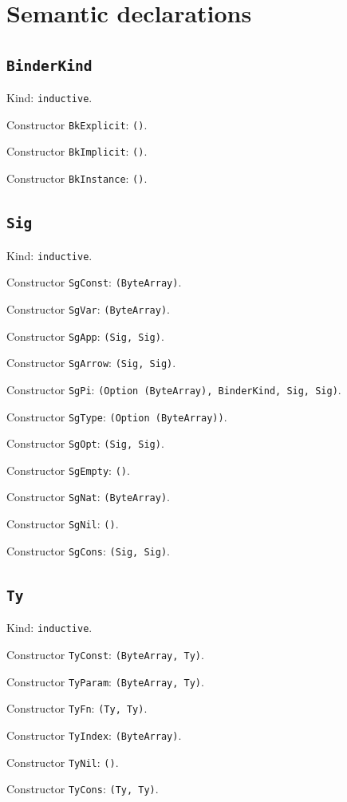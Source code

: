 \documentclass[11pt]{article}
\begin{document}
\section*{Semantic declarations}
\subsection*{\texttt{BinderKind}}
\noindent Kind: \texttt{inductive}.\par
\noindent Constructor \texttt{BkExplicit}: \texttt{()}.\par
\noindent Constructor \texttt{BkImplicit}: \texttt{()}.\par
\noindent Constructor \texttt{BkInstance}: \texttt{()}.\par
\subsection*{\texttt{Sig}}
\noindent Kind: \texttt{inductive}.\par
\noindent Constructor \texttt{SgConst}: \texttt{(ByteArray)}.\par
\noindent Constructor \texttt{SgVar}: \texttt{(ByteArray)}.\par
\noindent Constructor \texttt{SgApp}: \texttt{(Sig, Sig)}.\par
\noindent Constructor \texttt{SgArrow}: \texttt{(Sig, Sig)}.\par
\noindent Constructor \texttt{SgPi}: \texttt{(Option (ByteArray), BinderKind, Sig, Sig)}.\par
\noindent Constructor \texttt{SgType}: \texttt{(Option (ByteArray))}.\par
\noindent Constructor \texttt{SgOpt}: \texttt{(Sig, Sig)}.\par
\noindent Constructor \texttt{SgEmpty}: \texttt{()}.\par
\noindent Constructor \texttt{SgNat}: \texttt{(ByteArray)}.\par
\noindent Constructor \texttt{SgNil}: \texttt{()}.\par
\noindent Constructor \texttt{SgCons}: \texttt{(Sig, Sig)}.\par
\subsection*{\texttt{Ty}}
\noindent Kind: \texttt{inductive}.\par
\noindent Constructor \texttt{TyConst}: \texttt{(ByteArray, Ty)}.\par
\noindent Constructor \texttt{TyParam}: \texttt{(ByteArray, Ty)}.\par
\noindent Constructor \texttt{TyFn}: \texttt{(Ty, Ty)}.\par
\noindent Constructor \texttt{TyIndex}: \texttt{(ByteArray)}.\par
\noindent Constructor \texttt{TyNil}: \texttt{()}.\par
\noindent Constructor \texttt{TyCons}: \texttt{(Ty, Ty)}.\par
\end{document}
